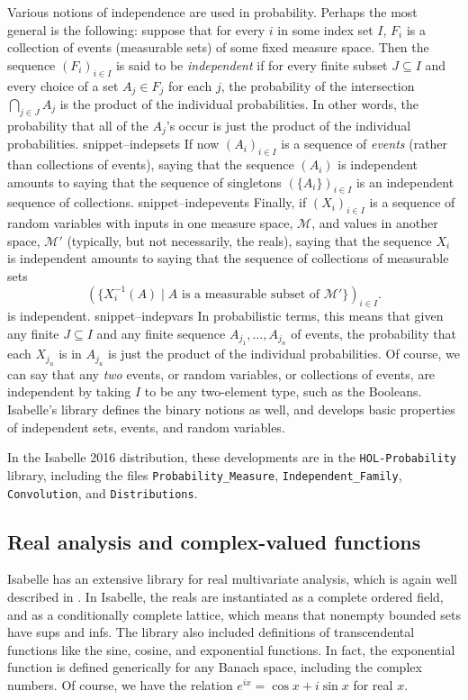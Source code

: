 \documentclass{svjour3}
\newcommand{\mdl}[1]{{\mathcal #1}} %
\newcommand{\Snippet}[1]{\csname snippet--#1\endcsname}
\begin{document}
Various notions of independence are used in probability. Perhaps the most general is the following: suppose that for every $i$ in some index set $I$, $F_i$ is a collection of events (measurable sets) of some fixed measure space. Then the sequence $(F_i)_{i \in I}$ is said to be \emph{independent} if for every finite subset $J \subseteq I$ and every choice of a set $A_j \in F_j$ for each $j$, the probability of the intersection $\bigcap_{j \in J} A_j$ is the product of the individual probabilities. In other words, the probability that all of the $A_j$'s occur is just the product of the individual probabilities.
\Snippet{indepsets}
If now $(A_i)_{i \in I}$ is a sequence of \emph{events} (rather than collections of events), saying that the sequence $(A_i)$ is independent amounts to saying that the sequence of singletons $(\{A_i\})_{i \in I}$ is an independent sequence of collections.
\Snippet{indepevents}
Finally, if $(X_i)_{i \in I}$ is a sequence of random variables with inputs in one measure space, $\mdl M$, and values in another space, $\mdl M'$ (typically, but not necessarily, the reals), saying that the sequence $X_i$ is independent amounts to saying that the sequence of collections of measurable sets 
\[
(\{ X_i^{-1}(A) \; | \; \mbox{$A$ is a measurable subset of $\mdl M'$}\})_{i \in I}.
\]
is independent.
\Snippet{indepvars}
In probabilistic terms, this means that given any finite $J \subseteq I$ and any finite sequence $A_{j_1}, \ldots, A_{j_n}$ of events, the probability that each $X_{j_u}$ is in $A_{j_u}$ is just the product of the individual probabilities. Of course, we can say that any \emph{two} events, or random variables, or collections of events, are independent by taking $I$ to be any two-element type, such as the Booleans. Isabelle's library defines the binary notions as well, and develops basic properties of independent sets, events, and random variables.

In the Isabelle 2016 distribution, these developments are in the \texttt{HOL-Probability} library, including the files \verb=Probability_Measure=, \verb=Independent_Family=, \texttt{Convolution}, and \texttt{Distributions}.

\subsection{Real analysis and complex-valued functions}
\label{subsection:real:analysis}

Isabelle has an extensive library for real multivariate analysis, which is again well described in \cite{hoelzl:et:al:13}. In Isabelle, the reals are instantiated as a complete ordered field, and as a conditionally complete lattice, which means that nonempty bounded sets have sups and infs. The library also included definitions of transcendental functions like the sine, cosine, and exponential functions. In fact, the exponential function is defined generically for any Banach space, including the complex numbers. Of course, we have the relation $e^{i x} = \cos x + i \sin x$ for real $x$.
\end{document}
